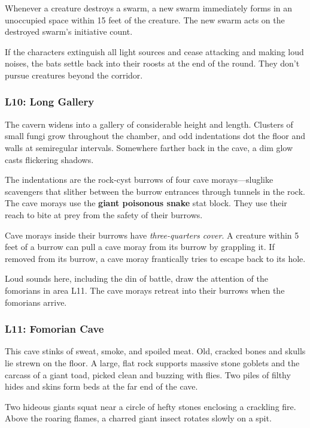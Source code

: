 \documentclass[10pt,a4paper,twoside,bg=print,twocolumn,openany,nodeprecatedcode]{dndbook}
\begin{document}
Whenever a creature destroys a swarm, a new swarm immediately forms in an unoccupied space within 15 feet of the creature. The new swarm acts on the destroyed swarm's initiative count.

If the characters extinguish all light sources and cease attacking and making loud noises, the bats settle back into their roosts at the end of the round. They don't pursue creatures beyond the corridor.

\subsubsection{L10: Long Gallery}
\begin{DndReadAloud}{}
The cavern widens into a gallery of considerable height and length. Clusters of small fungi grow throughout the chamber, and odd indentations dot the floor and walls at semiregular intervals. Somewhere farther back in the cave, a dim glow casts flickering shadows.

\end{DndReadAloud}

The indentations are the rock-cyst burrows of four cave morays—sluglike scavengers that slither between the burrow entrances through tunnels in the rock. The cave morays use the \textbf{giant poisonous snake} stat block. They use their reach to bite at prey from the safety of their burrows.

Cave morays inside their burrows have \textit{three-quarters cover}. A creature within 5 feet of a burrow can pull a cave moray from its burrow by grappling it. If removed from its burrow, a cave moray frantically tries to escape back to its hole.

Loud sounds here, including the din of battle, draw the attention of the fomorians in area L11. The cave morays retreat into their burrows when the fomorians arrive.

\subsubsection{L11: Fomorian Cave}
\begin{DndReadAloud}{}
This cave stinks of sweat, smoke, and spoiled meat. Old, cracked bones and skulls lie strewn on the floor. A large, flat rock supports massive stone goblets and the carcass of a giant toad, picked clean and buzzing with flies. Two piles of filthy hides and skins form beds at the far end of the cave.

Two hideous giants squat near a circle of hefty stones enclosing a crackling fire. Above the roaring flames, a charred giant insect rotates slowly on a spit.

\end{DndReadAloud}
\end{document}
